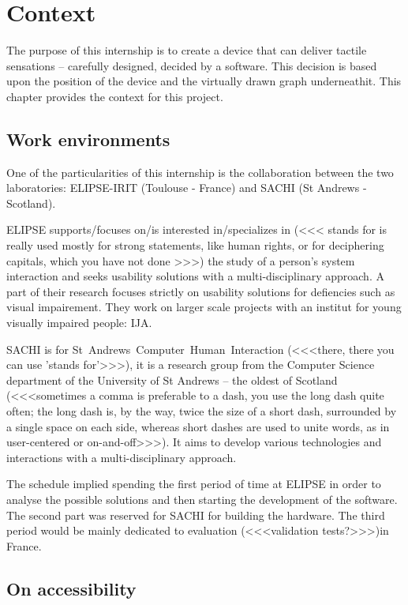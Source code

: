 \chapter{Context}

The purpose of this internship is to create a device that can deliver tactile sensations -- carefully designed, decided by a software. This decision is based upon the position of the device and the virtually drawn graph underneathit. This chapter provides the context for this project.

\section{Work environments}\label{work-environments}

One of the particularities of this internship is the collaboration between the two laboratories: ELIPSE-IRIT (Toulouse - France) and SACHI (St Andrews - Scotland). 

ELIPSE supports/focuses on/is interested in/specializes in (<<< stands for is really used mostly for strong statements, like human rights, or for deciphering capitals, which you have not done >>>) the study of a person's system interaction and seeks usability solutions with a multi-disciplinary approach. A part of their research focuses strictly on usability solutions for defiencies such as visual impairement. They work on larger scale projects with an institut for young visually impaired people: IJA.

SACHI is for St Andrews Computer Human Interaction (<<<there, there you can use 'stands for'>>>), it is a research group from the Computer Science department of the University of St Andrews -- the oldest of Scotland (<<<sometimes a comma is preferable to a dash, you use the long dash quite often; the long dash is, by the way, twice the size of a short dash, surrounded by a single space on each side, whereas short dashes are used to unite words, as in user-centered or on-and-off>>>). It aims to develop various technologies and interactions with a multi-disciplinary approach.

The schedule implied spending the first period of time at ELIPSE in order to analyse the possible solutions and then starting the development of the software. 
The second part was reserved for SACHI for building the hardware. 
The third period would be mainly dedicated to evaluation (<<<validation tests?>>>)in France.

\section{On accessibility}\label{on-accessibility}

